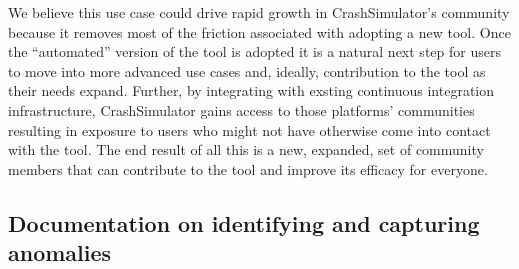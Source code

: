 \documentclass[twocolumn]{article}
\begin{document}
We believe this use case could drive rapid growth in CrashSimulator's
community because it removes most of the friction associated with adopting
a new tool.  Once the ``automated'' version of the tool is adopted it is a
natural next step for users to move into more advanced use cases and,
ideally, contribution to the tool as their needs expand.  Further, by
integrating with exsting continuous integration infrastructure,
CrashSimulator gains access to those platforms' communities resulting in
exposure to users who might not have otherwise come into contact with the
tool.  The end result of all this is a new, expanded, set of community
members that can contribute to the tool and improve its efficacy for
everyone.

\subsection{Documentation on identifying and capturing anomalies}
\end{document}

